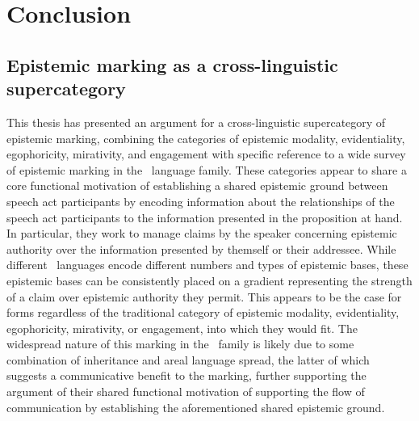 \chapter{Conclusion}\label{c:Conclusion}
\section{Epistemic marking as a cross-linguistic supercategory}
This thesis has presented an argument for a cross-linguistic supercategory of epistemic marking, combining the categories of epistemic modality, evidentiality, egophoricity, mirativity, and engagement with specific reference to a wide survey of epistemic marking in the \lfam\ language family. These categories appear to share a core functional motivation of establishing a shared epistemic ground between speech act participants by encoding information about the relationships of the speech act participants to the information presented in the proposition at hand. In particular, they work to manage claims by the speaker concerning epistemic authority over the information presented by themself or their addressee. While different \lfam\ languages encode different numbers and types of epistemic bases, these epistemic bases can be consistently placed on a gradient representing the strength of a claim over epistemic authority they permit. This appears to be the case for forms regardless of the traditional category of epistemic modality, evidentiality, egophoricity, mirativity, or engagement, into which they would fit. The widespread nature of this marking in the \lfam\ family is likely due to some combination of inheritance and areal language spread, the latter of which suggests a communicative benefit to the marking, further supporting the argument of their shared functional motivation of supporting the flow of communication by establishing the aforementioned shared epistemic ground.

